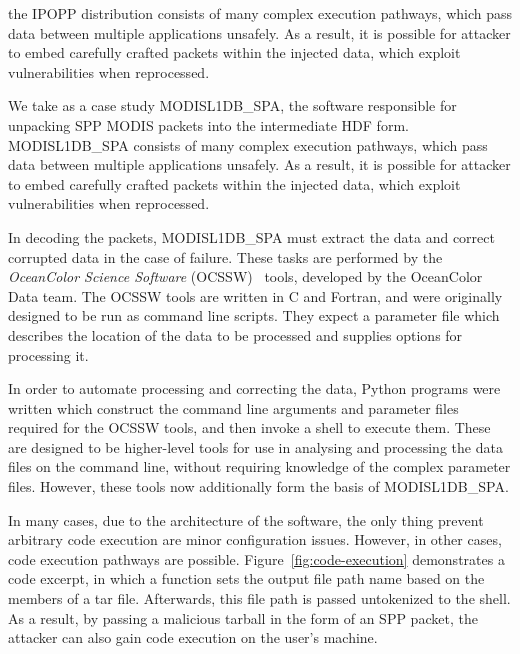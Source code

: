 the IPOPP distribution consists of many complex execution pathways, which pass data between multiple applications unsafely.
As a result, it is possible for attacker to embed carefully crafted packets within the injected data, which exploit vulnerabilities when reprocessed.

We take as a case study MODISL1DB\_SPA, the software responsible for unpacking SPP MODIS packets into the intermediate HDF form.
MODISL1DB\_SPA consists of many complex execution pathways, which pass data between multiple applications unsafely.
As a result, it is possible for attacker to embed carefully crafted packets within the injected data, which exploit vulnerabilities when reprocessed.

In decoding the packets, MODISL1DB\_SPA must extract the data and correct corrupted data in the case of failure.
These tasks are performed by the \textit{OceanColor Science Software} (OCSSW)~\cite{ocssw} tools, developed by the OceanColor Data team.
The OCSSW tools are written in C and Fortran, and were originally designed to be run as command line scripts.
They expect a parameter file which describes the location of the data to be processed and supplies options for processing it.

In order to automate processing and correcting the data, Python programs were written which construct the command line arguments and parameter files required for the OCSSW tools, and then invoke a shell to execute them.
These are designed to be higher-level tools for use in analysing and processing the data files on the command line, without requiring knowledge of the complex parameter files.
However, these tools now additionally form the basis of MODISL1DB\_SPA.

In many cases, due to the architecture of the software, the only thing prevent arbitrary code execution are minor configuration issues.
However, in other cases, code execution pathways are possible.
Figure~\ref{fig:code-execution} demonstrates a code excerpt, in which a function sets the output file path name based on the members of a tar file.
Afterwards, this file path is passed untokenized to the shell.
As a result, by passing a malicious tarball in the form of an SPP packet, the attacker can also gain code execution on the user's machine.

